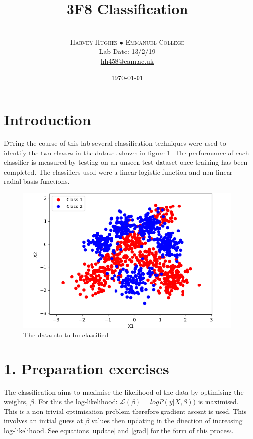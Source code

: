 \documentclass[twoside,twocolumn]{article}
\title{3F8 Classification} %
\author{%
\\
\textsc{Harvey Hughes $\bullet$ Emmanuel College } \\
\normalsize Lab Date: 13/2/19\\
\normalsize \href{mailto:hh458@cam.ac.uk}{hh458@cam.ac.uk} %
}
\date{\today} %
\begin{document}
\maketitle



\section{Introduction}

\lettrine[nindent=0em,lines=3]{D}uring the course of this lab several classification techniques were used to identify the two classes in the dataset shown in figure \ref{fig:1}. The performance of each classifier is measured by testing on an unseen test dataset once training has been completed. The classifiers used were a linear logistic function and non linear radial basis functions.

\begin{figure}[h]
  \centering
    \includegraphics[width=\linewidth]{1-Data}
  \caption{The datasets to be classified}
  \label{fig:1}
\end{figure}
\section{1. Preparation exercises}
The classification aims to maximise the likelihood of the data by optimising the weights, $\beta$. For this the log-likelihood: $\mathcal{L}(\beta )=logP(y|X,\beta ))$ is maximised. This is a non trivial optimisation problem therefore gradient ascent is used. This involves an initial guess at $\beta$ values then updating in the direction of increasing log-likelihood. See equations \ref{update} and \ref{grad} for the form of this process. 
\end{document}
